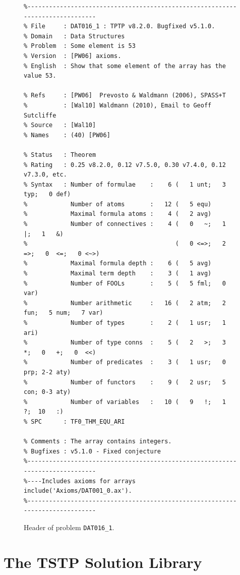 \documentclass{easychair}
\begin{document}
\begin{figure}[htb]
{\footnotesize
{\setlength{\baselineskip}{3mm}
\begin{verbatim}
%------------------------------------------------------------------------------
% File     : DAT016_1 : TPTP v8.2.0. Bugfixed v5.1.0.
% Domain   : Data Structures
% Problem  : Some element is 53
% Version  : [PW06] axioms.
% English  : Show that some element of the array has the value 53.

% Refs     : [PW06]  Prevosto & Waldmann (2006), SPASS+T
%          : [Wal10] Waldmann (2010), Email to Geoff Sutcliffe
% Source   : [Wal10]
% Names    : (40) [PW06]

% Status   : Theorem
% Rating   : 0.25 v8.2.0, 0.12 v7.5.0, 0.30 v7.4.0, 0.12 v7.3.0, etc.
% Syntax   : Number of formulae    :    6 (   1 unt;   3 typ;   0 def)
%            Number of atoms       :   12 (   5 equ)
%            Maximal formula atoms :    4 (   2 avg)
%            Number of connectives :    4 (   0   ~;   1   |;   1   &)
%                                         (   0 <=>;   2  =>;   0  <=;   0 <~>)
%            Maximal formula depth :    6 (   5 avg)
%            Maximal term depth    :    3 (   1 avg)
%            Number of FOOLs       :    5 (   5 fml;   0 var)
%            Number arithmetic     :   16 (   2 atm;   2 fun;   5 num;   7 var)
%            Number of types       :    2 (   1 usr;   1 ari)
%            Number of type conns  :    5 (   2   >;   3   *;   0   +;   0  <<)
%            Number of predicates  :    3 (   1 usr;   0 prp; 2-2 aty)
%            Number of functors    :    9 (   2 usr;   5 con; 0-3 aty)
%            Number of variables   :   10 (   9   !;   1   ?;  10   :)
% SPC      : TF0_THM_EQU_ARI

% Comments : The array contains integers.
% Bugfixes : v5.1.0 - Fixed conjecture
%------------------------------------------------------------------------------
%----Includes axioms for arrays
include('Axioms/DAT001_0.ax').
%------------------------------------------------------------------------------
\end{verbatim}
}}
\caption{Header of problem {\tt DAT016\_1}.}
\label{ExampleHeader}
\end{figure}

\section{The TSTP Solution Library}
\label{TSTP}
\end{document}
